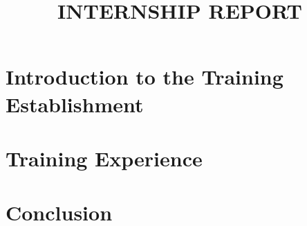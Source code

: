 \documentclass[12pt] {article}
\title{INTERNSHIP REPORT}
\begin{document}


\newpage

\tableofcontents
\newpage
\listoffigures
\listoftables
\newpage
{}


\newpage
\section{Introduction to the Training Establishment}


\newpage
\section{Training Experience}







\newpage
\section{Conclusion}


\newpage



 

\end{document}
